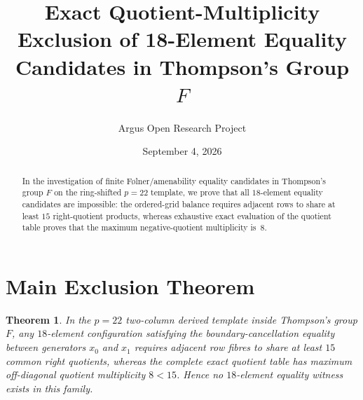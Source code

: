 \documentclass[10pt,reqno]{amsart}
\title[Quotient-Multiplicity Exclusion of 18-Element F\o{}lner Candidates in Thompson's Group $F$]
{Exact Quotient-Multiplicity Exclusion of 18-Element Equality Candidates in Thompson's Group $F$}
\author{Argus Open Research Project}
\date{September 4, 2026}
\newtheorem{theorem}{Theorem}[section]
\theoremstyle{definition}
\begin{document}
\begin{abstract}
In the investigation of finite F\o{}lner/amenability equality candidates in Thompson's group $F$ on the ring-shifted $p=22$ template, we prove that all $18$-element equality candidates are impossible: the ordered-grid balance requires adjacent rows to share at least $15$ right-quotient products, whereas exhaustive exact evaluation of the quotient table proves that the maximum negative-quotient multiplicity is~$8$.
\end{abstract}
\maketitle
\section{Main Exclusion Theorem}
\begin{theorem}
In the $p=22$ two-column derived template inside Thompson's group $F$, any $18$-element configuration satisfying the boundary-cancellation equality between generators $x_0$ and $x_1$ requires adjacent row fibres to share at least $15$ common right quotients, whereas the complete exact quotient table has maximum off-diagonal quotient multiplicity $8 < 15$. Hence no $18$-element equality witness exists in this family.
\end{theorem}
\end{document}
